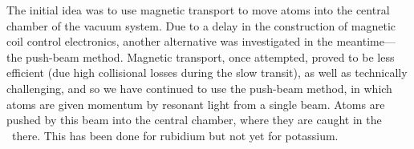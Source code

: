 The initial idea was to use magnetic transport to move atoms into the central chamber of the vacuum system. Due to a delay in the construction of magnetic coil control electronics, another alternative was investigated in the meantime---the push-beam method. Magnetic transport, once attempted, proved to be less efficient (due high collisional losses during the slow transit), as well as technically challenging, and so we have continued to use the push-beam method, in which atoms are given momentum by resonant light from a single beam. Atoms are pushed by this beam into the central chamber, where they are caught in the \mot\ there. This has been done for rubidium but not yet for potassium.
